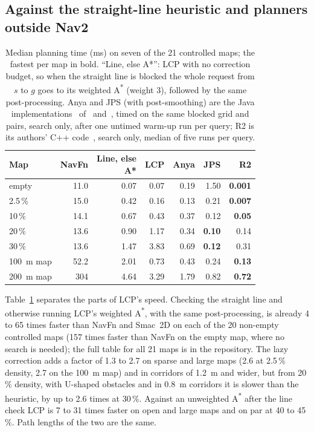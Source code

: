 \documentclass[conference]{IEEEtran}
\newcommand{\lcp}{LCP}
\begin{document}
\subsection{Against the straight-line heuristic and planners outside Nav2}
\label{sec:outside}

\begin{table}[t]
\centering
\caption{Median planning time (ms) on seven of the 21 controlled maps; the
fastest per map in bold. ``Line, else A*'': \lcp{} with no correction budget, so
when the straight line is blocked the whole request from $s$ to $g$ goes to its
weighted A\textsuperscript{*} (weight 3), followed by the same post-processing.
Anya and JPS (with post-smoothing) are the Java implementations~\cite{aapcode}
of~\cite{harabor2016anya} and~\cite{harabor2011jps}, timed on the same blocked
grid and pairs, search only, after one untimed warm-up run per query; R2 is its
authors' C++ code~\cite{r2code}, search only, median of five runs per query.}
\label{tab:outside}
\setlength{\tabcolsep}{3pt}
\footnotesize
\begin{tabular}{@{}lrrrrrr@{}}
\toprule
Map & NavFn & \shortstack[r]{Line, else\\A*} & \lcp{} & Anya & JPS & R2 \\
\midrule
empty            & 11.0 & 0.07 & 0.07 & 0.19 & 1.50 & \textbf{0.001} \\
2.5\,\%          & 15.0 & 0.42 & 0.16 & 0.13 & 0.21 & \textbf{0.007} \\
10\,\%           & 14.1 & 0.67 & 0.43 & 0.37 & 0.12 & \textbf{0.05} \\
20\,\%           & 13.6 & 0.90 & 1.17 & 0.34 & \textbf{0.10} & 0.14 \\
30\,\%           & 13.6 & 1.47 & 3.83 & 0.69 & \textbf{0.12} & 0.31 \\
\SI{100}{m} map  & 52.2 & 2.01 & 0.73 & 0.43 & 0.24 & \textbf{0.13} \\
\SI{200}{m} map  & 304  & 4.64 & 3.29 & 1.79 & 0.82 & \textbf{0.72} \\
\bottomrule
\end{tabular}
\end{table}

Table~\ref{tab:outside} separates the parts of \lcp{}'s speed. Checking the
straight line and otherwise running \lcp{}'s weighted A\textsuperscript{*}, with
the same post-processing, is already 4 to 65 times faster than NavFn and Smac~2D on
each of the 20 non-empty controlled maps (157 times faster than NavFn on the empty
map, where no search is needed); the full table for all 21 maps is in the
repository. The lazy correction adds a factor of 1.3 to 2.7 on sparse
and large maps (2.6 at 2.5\,\% density, 2.7 on the \SI{100}{m} map) and in
corridors of \SI{1.2}{m} and wider, but from 20\,\% density, with U-shaped
obstacles and in \SI{0.8}{m} corridors it is slower than the heuristic, by up to
2.6 times at 30\,\%. Against an unweighted A\textsuperscript{*} after the line
check \lcp{} is 7 to 31 times faster on open and large maps and on par at 40 to
45\,\%. Path lengths of the two are the same.
\end{document}
